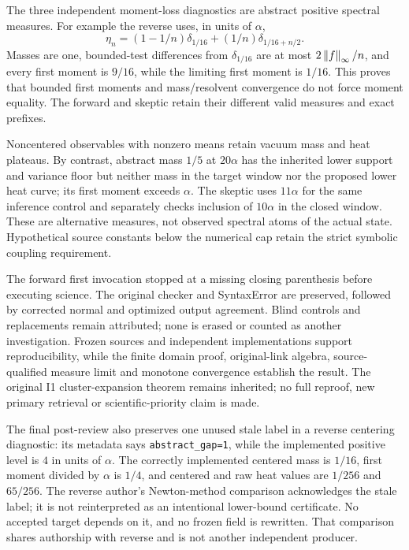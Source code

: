 The three independent moment-loss diagnostics are abstract positive spectral measures. For example the reverse uses, in units of $\alpha$,
\begin{equation}
 \eta_n=(1-1/n)\delta_{1/16}+(1/n)\delta_{1/16+n/2}.
\end{equation}
Masses are one, bounded-test differences from $\delta_{1/16}$ are at most $2\left\lVert f\right\rVert_\infty/n$, and every first moment is $9/16$, while the limiting first moment is $1/16$. This proves that bounded first moments and mass/resolvent convergence do not force moment equality. The forward and skeptic retain their different valid measures and exact prefixes.

Noncentered observables with nonzero means retain vacuum mass and heat plateaus. By contrast, abstract mass $1/5$ at $20\alpha$ has the inherited lower support and variance floor but neither mass in the target window nor the proposed lower heat curve; its first moment exceeds $\alpha$. The skeptic uses $11\alpha$ for the same inference control and separately checks inclusion of $10\alpha$ in the closed window. These are alternative measures, not observed spectral atoms of the actual state. Hypothetical source constants below the numerical cap retain the strict symbolic coupling requirement.

The forward first invocation stopped at a missing closing parenthesis before executing science. The original checker and SyntaxError are preserved, followed by corrected normal and optimized output agreement. Blind controls and replacements remain attributed; none is erased or counted as another investigation. Frozen sources and independent implementations support reproducibility, while the finite domain proof, original-link algebra, source-qualified measure limit and monotone convergence establish the result. The original I1 cluster-expansion theorem remains inherited; no full reproof, new primary retrieval or scientific-priority claim is made.

The final post-review also preserves one unused stale label in a reverse centering diagnostic: its metadata says \texttt{abstract\_gap=1}, while the implemented positive level is $4$ in units of $\alpha$. The correctly implemented centered mass is $1/16$, first moment divided by $\alpha$ is $1/4$, and centered and raw heat values are $1/256$ and $65/256$. The reverse author's Newton-method comparison acknowledges the stale label; it is not reinterpreted as an intentional lower-bound certificate. No accepted target depends on it, and no frozen field is rewritten. That comparison shares authorship with reverse and is not another independent producer.


